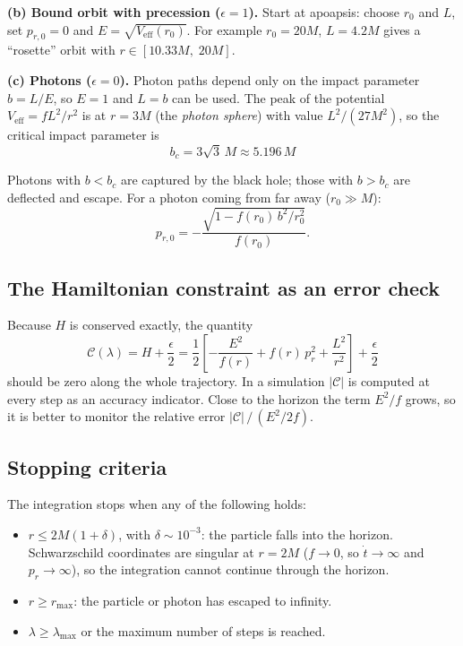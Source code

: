\documentclass[11pt,a4paper]{article}
\newcommand{\Veff}{V_{\text{eff}}}
\begin{document}
\textbf{(b) Bound orbit with precession ($\epsilon = 1$).} Start at apoapsis: choose $r_0$ and $L$, set $p_{r,0} = 0$ and $E = \sqrt{\Veff(r_0)}$. For example $r_0 = 20M$, $L = 4.2M$ gives a ``rosette'' orbit with $r \in [10.33M,\; 20M]$.

\textbf{(c) Photons ($\epsilon = 0$).} Photon paths depend only on the impact parameter $b = L/E$, so $E = 1$ and $L = b$ can be used. The peak of the potential $\Veff = fL^2/r^2$ is at $r = 3M$ (the \emph{photon sphere}) with value $L^2/(27M^2)$, so the critical impact parameter is
\begin{equation*}
b_c = 3\sqrt{3}\, M \approx 5.196\, M \tag{30}\label{eq:30}
\end{equation*}

Photons with $b < b_c$ are captured by the black hole; those with $b > b_c$ are deflected and escape. For a photon coming from far away ($r_0 \gg M$):
\begin{equation*}
p_{r,0} = -\frac{\sqrt{1 - f(r_0)\, b^2 / r_0^2}}{f(r_0)}.
\end{equation*}

\subsection{The Hamiltonian constraint as an error check}

Because $H$ is conserved exactly, the quantity
\begin{equation*}
\mathcal{C}(\lambda) = H + \frac{\epsilon}{2} = \frac{1}{2}\left[ -\frac{E^2}{f(r)} + f(r)\, p_r^2 + \frac{L^2}{r^2} \right] + \frac{\epsilon}{2} \tag{31}\label{eq:31}
\end{equation*}
should be zero along the whole trajectory. In a simulation $|\mathcal{C}|$ is computed at every step as an accuracy indicator. Close to the horizon the term $E^2/f$ grows, so it is better to monitor the relative error $|\mathcal{C}| \,/\, \left(E^2 / 2f\right)$.

\subsection{Stopping criteria}
\label{sec:stop}

The integration stops when any of the following holds:
\begin{itemize}
  \item $r \leq 2M(1 + \delta)$, with $\delta \sim 10^{-3}$: the particle falls into the horizon. Schwarzschild coordinates are singular at $r = 2M$ ($f \to 0$, so $\dot{t} \to \infty$ and $p_r \to \infty$), so the integration cannot continue through the horizon.
  \item $r \geq r_{\text{max}}$: the particle or photon has escaped to infinity.
  \item $\lambda \geq \lambda_{\text{max}}$ or the maximum number of steps is reached.
\end{itemize}
\end{document}
